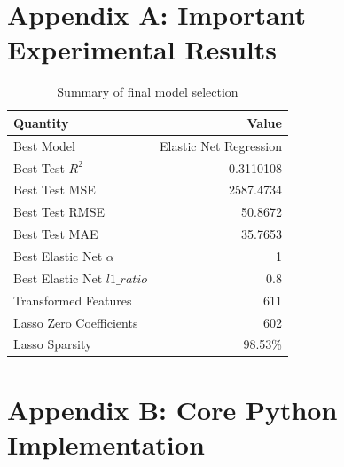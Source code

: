 \documentclass[12pt,a4paper]{article}
\begin{document}
\appendix
\section{Appendix A: Important Experimental Results}

\begin{table}[H]
\centering
\caption{Summary of final model selection}
\begin{tabular}{lr}
\toprule
\textbf{Quantity} & \textbf{Value} \\
\midrule
Best Model & Elastic Net Regression \\
Best Test $R^2$ & 0.3110108 \\
Best Test MSE & 2587.4734 \\
Best Test RMSE & 50.8672 \\
Best Test MAE & 35.7653 \\
Best Elastic Net $\alpha$ & 1 \\
Best Elastic Net $l1\_ratio$ & 0.8 \\
Transformed Features & 611 \\
Lasso Zero Coefficients & 602 \\
Lasso Sparsity & 98.53\% \\
\bottomrule
\end{tabular}
\end{table}

\section{Appendix B: Core Python Implementation}
\end{document}
